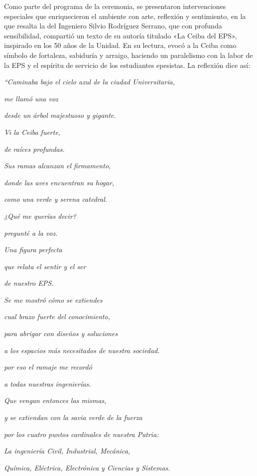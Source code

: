 \documentclass[12pt,spanish,Letterpaper,openany]{book}
\begin{document}
Como parte del programa de la ceremonia, se presentaron intervenciones especiales que enriquecieron el ambiente con arte, reflexión y sentimiento, en la que resalta la del Ingeniero Silvio Rodríguez Serrano, que con profunda sensibilidad, compartió un texto de su autoría titulado «La Ceiba del EPS», inspirado en los 50 años de la Unidad. En su lectura, evocó a la Ceiba como símbolo de fortaleza, sabiduría y arraigo, haciendo un paralelismo con la labor de la EPS y el espíritu de servicio de los estudiantes epesistas. La reflexión dice así:
\begin{center}
\emph{``Caminaba bajo el cielo azul de la ciudad Universitaria,}

\emph{me llamó una voz}

\emph{desde un árbol majestuoso y gigante.}

\emph{Vi la Ceiba fuerte,}

\emph{de raíces profundas.}

\emph{Sus ramas alcanzan el firmamento,}

\emph{donde las aves encuentran su hogar,}

\emph{como una verde y serena catedral.}

\bigskip

\emph{¿Qué me querías decir?}

\emph{pregunté a la voz.}

\emph{Una figura perfecta}

\emph{que relata el sentir y el ser}

\emph{de nuestro EPS.}

\emph{Se me mostró cómo se extiendes}

\emph{cual brazo fuerte del conocimiento,}

\emph{para abrigar con diseños y soluciones}

\emph{a los espacios más necesitados de nuestra sociedad.}

\emph{por eso el ramaje me recordó}

\emph{a todas nuestras ingenierías.}

\emph{Que vengan entonces las mismas,}

\emph{y se extiendan con la savia verde de la fuerza}

\emph{por los cuatro puntos cardinales de nuestra Patria:}

\emph{La ingeniería Civil, Industrial, Mecánica,}

\emph{Química, Eléctrica, Electrónica y Ciencias y Sistemas.}


\end{center}
\end{document}
